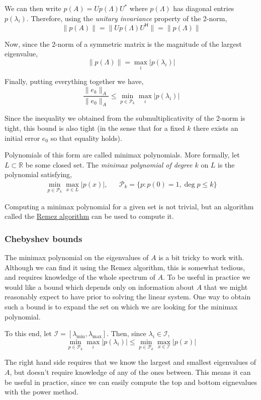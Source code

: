 \documentclass[10pt]{article}
\begin{document}
We can then write \(p(A) = Up(\Lambda)U^*\) where \(p(\Lambda)\) has diagonal entries \(p(\lambda_i)\).
Therefore, using the \emph{unitary invariance} property of the 2-norm,
\[
\|p(A)\| = \|Up(\Lambda)U^{\mathsf{H}}\| = \|p(\Lambda)\|
\]

Now, since the 2-norm of a symmetric matrix is the magnitude of the largest eigenvalue,
\[
\| p(\Lambda) \| = \max_i |p(\lambda_i)|
\]

Finally, putting everything together we have,
\[
\frac{\|e_k\|_A}{\|e_0\|_A} \leq \min_{p\in\mathcal{P}_k} \max_i |p(\lambda_i)|
\]

Since the inequality we obtained from the submultiplicativity of the 2-norm is tight, this bound is also tight (in the sense that for a fixed \(k\) there exists an initial error \(e_0\) so that equality holds).

Polynomials of this form are called minimax polynomials.
More formally, let \(L\subset \mathbb{R}\) be some closed set.
The \emph{minimax polynomial of degree \(k\)} on \(L\) is the polynomial satisfying,
\begin{align*}
\min_{p\in\mathcal{P}_k} \max_{x\in L} | p(x) |
,&&
\mathcal{P}_k = \{p : p(0)=1, \deg p \leq k\}    
\end{align*}

Computing a minimax polynomial for a given set is not trivial, but an algorithm called the \href{./remez.html}{Remez algorithm} can be used to compute it.

\subsubsection{Chebyshev bounds}

The minimax polynomial on the eigenvalues of \(A\) is a bit tricky to work with.
Although we can find it using the Remez algorithm, this is somewhat tedious, and requires knowledge of the whole spectrum of \(A\).
To be useful in practice we would like a bound which depends only on information about \(A\) that we might reasonably expect to have prior to solving the linear system.
One way to obtain such a bound is to expand the set on which we are looking for the minimax polynomial.

To this end, let \(\mathcal{I} = [\lambda_{\text{min}},\lambda_{\text{max}}]\).
Then, since \(\lambda_i\in\mathcal{I}\),
\[
\min_{p\in\mathcal{P}_k} \max_i |p(\lambda_i)| 
\leq \min_{p\in\mathcal{P}_k} \max_{x \in \mathcal{I}} |p(x)| 
\]

The right hand side requires that we know the largest and smallest eigenvalues of \(A\), but doesn't require knowledge of any of the ones between.
This means it can be useful in practice, since we can easily compute the top and bottom eignevalues with the power method.
\end{document}
